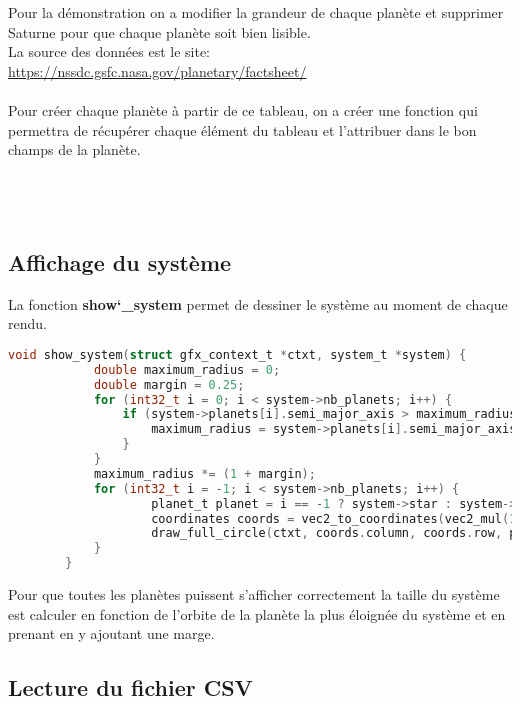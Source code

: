 \documentclass[a4paper,10pt]{article}
\begin{document}
    Pour la démonstration on a modifier la grandeur de chaque planète et supprimer Saturne pour que chaque planète soit bien lisible.\\
    La source des données est le site: \href{https://nssdc.gsfc.nasa.gov/planetary/factsheet/}{https://nssdc.gsfc.nasa.gov/planetary/factsheet/} \\\\
    
    Pour créer chaque planète à partir de ce tableau, on a créer une fonction qui permettra de récupérer chaque élément du tableau et l'attribuer dans le bon champs de la planète.\\\\\\\\
    
    
    \subsection{Affichage du système}\label{subsec:affichage-du-système}

    La fonction \textbf{show\char`_system} permet de dessiner le système au moment de chaque rendu.

    \begin{lstlisting}[language=c,label={lst:lstlisting8}]
        void show_system(struct gfx_context_t *ctxt, system_t *system) {
            double maximum_radius = 0;
            double margin = 0.25;
            for (int32_t i = 0; i < system->nb_planets; i++) {
                if (system->planets[i].semi_major_axis > maximum_radius) {
                    maximum_radius = system->planets[i].semi_major_axis;
                }
            }
            maximum_radius *= (1 + margin);
            for (int32_t i = -1; i < system->nb_planets; i++) {
                    planet_t planet = i == -1 ? system->star : system->planets[i];
                    coordinates coords = vec2_to_coordinates(vec2_mul(1.0 / maximum_radius, planet.pos), SCREEN_WIDTH, SCREEN_HEIGHT);
                    draw_full_circle(ctxt, coords.column, coords.row, planet.radius, planet.color);
            }
        }
    \end{lstlisting}

    Pour que toutes les planètes puissent s'afficher correctement la taille du système est calculer en fonction de l'orbite de la planète la plus éloignée du système et en prenant en y ajoutant une marge.

    \subsection{Lecture du fichier CSV}\label{subsec:lecture-du-fichier-csv}
\end{document}

